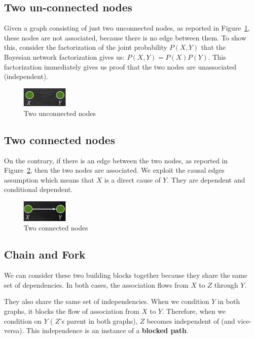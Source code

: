 \subsection{Two un-connected nodes}
Given a graph consisting of just two unconnected nodes, as reported in Figure~\ref{fig:two_unconnected_nodes},
these nodes are not associated, because there is no edge between them. To show
this, consider the factorization of the joint probability $P(X, Y)$ that the
Bayesian network factorization gives us: $P(X, Y) = P(X)P(Y)$. This factorization
immediately gives us proof that the two nodes are unassociated (independent).

\begin{figure}[!ht]
    \centering
    \includegraphics[width=0.2\textwidth]{img/flow/two_unconnected_nodes.png}
    \caption{Two unconnected nodes}
    \label{fig:two_unconnected_nodes}
\end{figure}
\subsection{Two connected nodes}
On the contrary, if there is an edge between the two nodes, as reported in Figure~\ref{fig:two_connected_nodes},
then the two nodes are associated. We exploit the causal edges assumption which
means that $X$ is a direct cause of $Y$. They are dependent and conditional dependent.

\begin{figure}[!ht]
    \centering
    \includegraphics[width=0.2\textwidth]{img/flow/two_connected_nodes.png}
    \caption{Two connected nodes}
    \label{fig:two_connected_nodes}
\end{figure}

\subsection{Chain and Fork}
We can consider these two building blocks together because they share the same
set of dependencies. In both cases, the association flows from $X$ to $Z$ through
$Y$.

They also share the same set of independencies. When we condition $Y$ in both
graphs, it blocks the flow of association from $X$ to $Y$. Therefore, when we
condition on $Y$ ( $Z$'s parent in both graphs), $Z$ becomes independent of (and
vice-versa). This independence is an instance of a \textbf{blocked path}.

